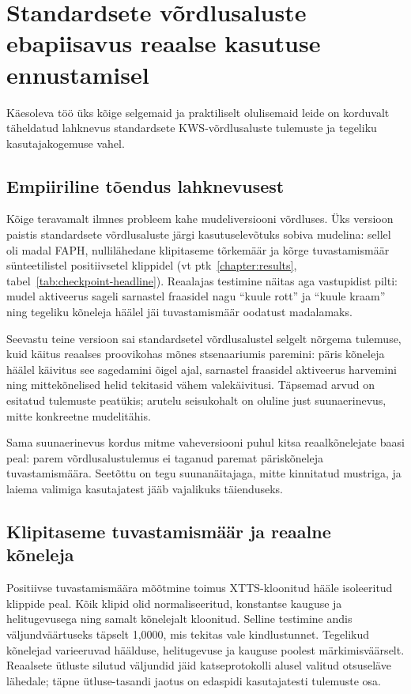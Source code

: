 \section{Standardsete võrdlusaluste ebapiisavus reaalse kasutuse ennustamisel}
\label{sec:benchmark-gap}

Käesoleva töö üks kõige selgemaid ja praktiliselt olulisemaid leide on korduvalt täheldatud lahknevus standardsete KWS-võrdlusaluste tulemuste ja tegeliku kasutajakogemuse vahel.

\subsection{Empiiriline tõendus lahknevusest}

Kõige teravamalt ilmnes probleem kahe mudeliversiooni võrdluses. Üks versioon paistis standardsete võrdlusaluste järgi kasutuselevõtuks sobiva mudelina: sellel oli madal FAPH, nullilähedane klipitaseme tõrkemäär ja kõrge tuvastamismäär sünteetilistel positiivsetel klippidel (vt ptk~\ref{chapter:results}, tabel~\ref{tab:checkpoint-headline}). Reaalajas testimine näitas aga vastupidist pilti: mudel aktiveerus sageli sarnastel fraasidel nagu \enquote{kuule rott} ja \enquote{kuule kraam} ning tegeliku kõneleja häälel jäi tuvastamismäär oodatust madalamaks.

Seevastu teine versioon sai standardsetel võrdlusalustel selgelt nõrgema tulemuse, kuid käitus reaalses proovikohas mõnes stsenaariumis paremini: päris kõneleja häälel käivitus see sagedamini õigel ajal, sarnastel fraasidel aktiveerus harvemini ning mittekõnelised helid tekitasid vähem valekäivitusi. Täpsemad arvud on esitatud tulemuste peatükis; arutelu seisukohalt on oluline just suunaerinevus, mitte konkreetne mudelitähis.

Sama suunaerinevus kordus mitme vaheversiooni puhul kitsa reaalkõnelejate baasi peal: parem võrdlusalustulemus ei taganud paremat päriskõneleja tuvastamismäära. Seetõttu on tegu suunanäitajaga, mitte kinnitatud mustriga, ja laiema valimiga kasutajatest jääb vajalikuks täienduseks.

\subsection{Klipitaseme tuvastamismäär ja reaalne kõneleja}

Positiivse tuvastamismäära mõõtmine toimus XTTS-kloonitud hääle isoleeritud klippide peal. Kõik klipid olid normaliseeritud, konstantse kauguse ja helitugevusega ning samalt kõnelejalt kloonitud. Selline testimine andis väljundväärtuseks täpselt 1,0000, mis tekitas vale kindlustunnet. Tegelikud kõnelejad varieeruvad häälduse, helitugevuse ja kauguse poolest märkimisväärselt. Reaalsete ütluste silutud väljundid jäid katseprotokolli alusel valitud otsuseläve lähedale; täpne ütluse-tasandi jaotus on edaspidi kasutajatesti tulemuste osa.

